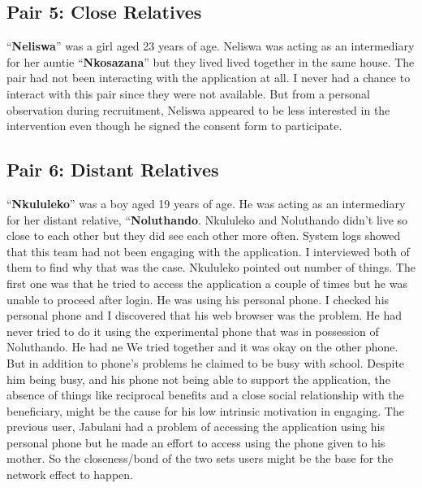 \subsection*{\textbf{Pair 5: Close Relatives}}
``\textbf{Neliswa}'' was a girl aged 23 years of age. Neliswa  was acting as an intermediary for her auntie ``\textbf{Nkosazana}'' but they lived lived together in the same house. The pair had not been interacting with the application at all. I never had a chance to interact with this pair since they were not available. But from a personal observation during recruitment, Neliswa appeared to be less interested in the intervention even though he signed the consent form to participate. 
\subsection*{\textbf{Pair 6: Distant Relatives}}
``\textbf{Nkululeko}'' was a boy aged 19 years of age. He was acting as an intermediary for her distant relative, ``\textbf{Noluthando}. Nkululeko and Noluthando didn't live so close to each other but they did see each other more often. System logs showed that this team had not been engaging with the application. I interviewed both of them to find why that was the case. Nkululeko pointed out number of things. The first one was that he tried to access the application a couple of times but he was unable to proceed after login. He was using his personal phone. I checked his personal phone and I discovered that his web browser was the problem. He had never tried to do it using the experimental phone that was in possession of Noluthando. He had ne We tried together and it was okay on the other phone.  But in addition to phone's problems he claimed to be busy with school. Despite him being busy, and his phone not being able to support the application,  the absence of things like reciprocal benefits  and a close social relationship with the beneficiary, might be the cause for his low intrinsic motivation in engaging. The previous user, Jabulani had a problem of accessing the application using his personal phone but he made an effort to access using the phone  given to his mother. So the closeness/bond of the two sets users might be the base for the network effect to happen.
